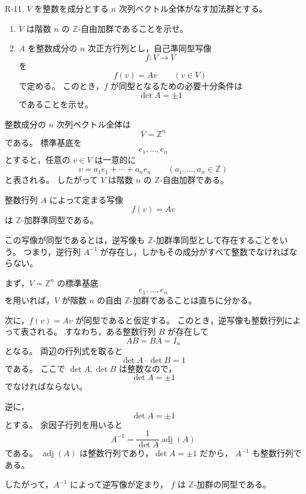 
\begin{exercise}
	R-11. $V$ を整数を成分とする $n$ 次列ベクトル全体がなす加法群とする。
	\begin{enumerate}
		\item $V$ は階数 $n$ の $\mathbb{Z}$-自由加群であることを示せ。
		\item $A$ を整数成分の $n$ 次正方行列とし，自己準同型写像
		\[
		f:V\longrightarrow V
		\]
		を
		\[
		f(v)=Av
		\qquad
		(v\in V)
		\]
		で定める。
		このとき，$f$ が同型となるための必要十分条件は
		\[
		\det A=\pm 1
		\]
		であることを示せ。
	\end{enumerate}
\end{exercise}

\begin{background}
	整数成分の $n$ 次列ベクトル全体は
	\[
	V=\mathbb{Z}^n
	\]
	である。
	標準基底を
	\[
	e_1,\dots,e_n
	\]
	とすると，任意の $v\in V$ は一意的に
	\[
	v=a_1e_1+\cdots+a_ne_n
	\qquad
	(a_1,\dots,a_n\in\mathbb{Z})
	\]
	と表される。
	したがって $V$ は階数 $n$ の $\mathbb{Z}$-自由加群である。
	
	整数行列 $A$ によって定まる写像
	\[
	f(v)=Av
	\]
	は $\mathbb{Z}$-加群準同型である。
	
	この写像が同型であるとは，逆写像も $\mathbb{Z}$-加群準同型として存在することをいう。
	つまり，逆行列 $A^{-1}$ が存在し，しかもその成分がすべて整数でなければならない。
\end{background}

\begin{strategy}
	まず，$V=\mathbb{Z}^n$ の標準基底
	\[
	e_1,\dots,e_n
	\]
	を用いれば，$V$ が階数 $n$ の自由 $\mathbb{Z}$-加群であることは直ちに分かる。
	
	次に，$f(v)=Av$ が同型であると仮定する。
	このとき，逆写像も整数行列によって表される。
	すなわち，ある整数行列 $B$ が存在して
	\[
	AB=BA=I_n
	\]
	となる。
	両辺の行列式を取ると
	\[
	\det A\cdot \det B=1
	\]
	である。
	ここで $\det A,\det B$ は整数なので，
	\[
	\det A=\pm 1
	\]
	でなければならない。
	
	逆に，
	\[
	\det A=\pm 1
	\]
	とする。
	余因子行列を用いると
	\[
	A^{-1}
	=
	\frac{1}{\det A}\operatorname{adj}(A)
	\]
	である。
	$\operatorname{adj}(A)$ は整数行列であり，$\det A=\pm 1$ だから，
	$A^{-1}$ も整数行列である。
	
	したがって，$A^{-1}$ によって逆写像が定まり，
	$f$ は $\mathbb{Z}$-加群の同型である。
\end{strategy}